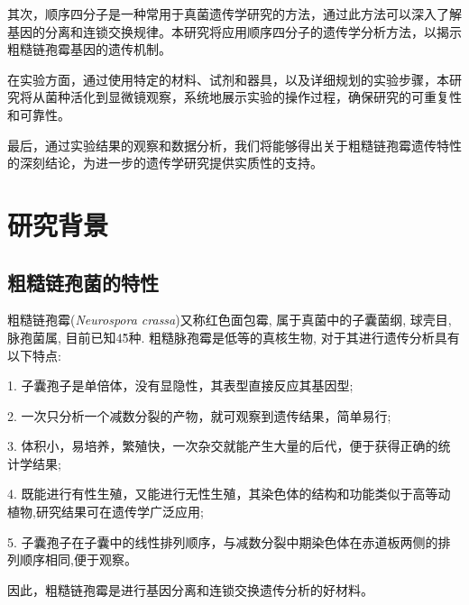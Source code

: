 \documentclass[]{LZUThesis}
\begin{document}
其次，顺序四分子是一种常用于真菌遗传学研究的方法，通过此方法可以深入了解基因的分离和连锁交换规律。本研究将应用顺序四分子的遗传学分析方法，以揭示粗糙链孢霉基因的遗传机制。

在实验方面，通过使用特定的材料、试剂和器具，以及详细规划的实验步骤，本研究将从菌种活化到显微镜观察，系统地展示实验的操作过程，确保研究的可重复性和可靠性。

最后，通过实验结果的观察和数据分析，我们将能够得出关于粗糙链孢霉遗传特性的深刻结论，为进一步的遗传学研究提供实质性的支持。

\chapter{研究背景}
\section{粗糙链孢菌的特性}
粗糙链孢霉(\textit{Neurospora crassa})又称红色面包霉, 属于真菌中的子囊菌纲, 球壳目, 脉孢菌属, 目前已知4\~5种.
粗糙脉孢霉是低等的真核生物, 对于其进行遗传分析具有以下特点:\par
1. 子囊孢子是单倍体，没有显隐性，其表型直接反应其基因型;\par
2. 一次只分析一个减数分裂的产物，就可观察到遗传结果，简单易行;\par
3. 体积小，易培养，繁殖快，一次杂交就能产生大量的后代，便于获得正确的统计学结果;\par
4. 既能进行有性生殖，又能进行无性生殖，其染色体的结构和功能类似于高等动植物,研究结果可在遗传学广泛应用;\par
5. 子囊孢子在子囊中的线性排列顺序，与减数分裂中期染色体在赤道板两侧的排列顺序相同,便于观察。\par
因此，粗糙链孢霉是进行基因分离和连锁交换遗传分析的好材料。
\end{document}

